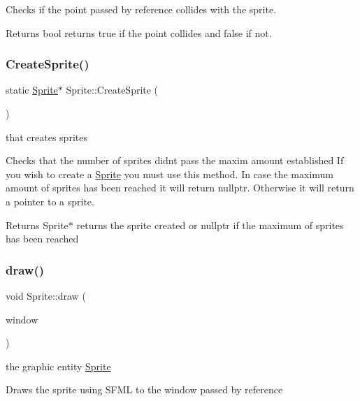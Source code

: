 Checks if the point passed by reference collides with the sprite.

\begin{DoxyReturn}{Returns}
bool returns true if the point collides and false if not. 
\end{DoxyReturn}
\mbox{\label{class_sprite_aaabea785dc01ff0246b290fc9e6b3f62}} 
\subsubsection{\texorpdfstring{Create\+Sprite()}{CreateSprite()}}
{\footnotesize\ttfamily static \hyperlink{class_sprite}{Sprite}$\ast$ Sprite\+::\+Create\+Sprite (\begin{DoxyParamCaption}{ }\end{DoxyParamCaption})\hspace{0.3cm}{\ttfamily [static]}}

that creates sprites

Checks that the number of sprites didn\textquotesingle{}t pass the maxim amount established If you wish to create a \hyperlink{class_sprite}{Sprite} you must use this method. In case the maximum amount of sprites has been reached it will return nullptr. Otherwise it will return a pointer to a sprite.

\begin{DoxyReturn}{Returns}
Sprite$\ast$ returns the sprite created or nullptr if the maximum of sprites has been reached 
\end{DoxyReturn}
\mbox{\label{class_sprite_adf1e840c7fe51abacc8a8f80c9e63c81}} 
\subsubsection{\texorpdfstring{draw()}{draw()}}
{\footnotesize\ttfamily void Sprite\+::draw (\begin{DoxyParamCaption}\item[{sf\+::\+Render\+Window \&}]{window }\end{DoxyParamCaption})}

the graphic entity \hyperlink{class_sprite}{Sprite}

Draws the sprite using S\+F\+ML to the window passed by reference

